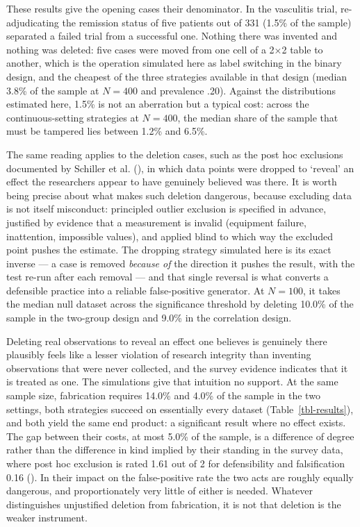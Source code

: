 \documentclass[
  nonatbib,
  authoryear,
  preprint]{elsarticle}
\begin{document}
These results give the opening cases their denominator. In the
vasculitis trial, re-adjudicating the remission status of five patients
out of 331 (1.5\% of the sample) separated a failed trial from a
successful one. Nothing there was invented and nothing was deleted: five
cases were moved from one cell of a 2×2 table to another, which is the
operation simulated here as label switching in the binary design, and
the cheapest of the three strategies available in that design (median
3.8\% of the sample at \(N = 400\) and prevalence .20). Against the
distributions estimated here, 1.5\% is not an aberration but a typical
cost: across the continuous-setting strategies at \(N = 400\), the
median share of the sample that must be tampered lies between 1.2\% and
6.5\%.

The same reading applies to the deletion cases, such as the post hoc
exclusions documented by Schiller et al.
(), in which data points were
dropped to `reveal' an effect the researchers appear to have genuinely
believed was there. It is worth being precise about what makes such
deletion dangerous, because excluding data is not itself misconduct:
principled outlier exclusion is specified in advance, justified by
evidence that a measurement is invalid (equipment failure, inattention,
impossible values), and applied blind to which way the excluded point
pushes the estimate. The dropping strategy simulated here is its exact
inverse --- a case is removed \emph{because of} the direction it pushes
the result, with the test re-run after each removal --- and that single
reversal is what converts a defensible practice into a reliable
false-positive generator. At \(N = 100\), it takes the median null
dataset across the significance threshold by deleting 10.0\% of the
sample in the two-group design and 9.0\% in the correlation design.

Deleting real observations to reveal an effect one believes is genuinely
there plausibly feels like a lesser violation of research integrity than
inventing observations that were never collected, and the survey
evidence indicates that it is treated as one. The simulations give that
intuition no support. At the same sample size, fabrication requires
14.0\% and 4.0\% of the sample in the two settings, both strategies
succeed on essentially every dataset (Table~\ref{tbl-results}), and both
yield the same end product: a significant result where no effect exists.
The gap between their costs, at most 5.0\% of the sample, is a
difference of degree rather than the difference in kind implied by their
standing in the survey data, where post hoc exclusion is rated 1.61 out
of 2 for defensibility and falsification 0.16
(). In their impact
on the false-positive rate the two acts are roughly equally dangerous,
and proportionately very little of either is needed. Whatever
distinguishes unjustified deletion from fabrication, it is not that
deletion is the weaker instrument.
\end{document}
